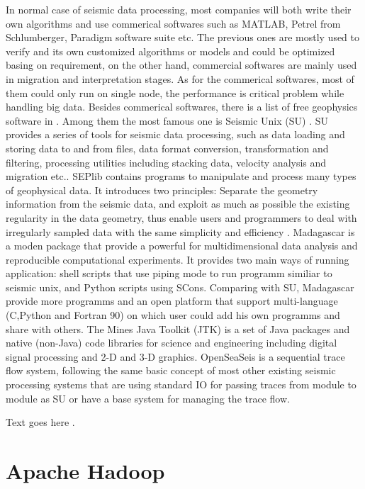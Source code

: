 In normal case of seismic data processing, most companies will both write their own algorithms and use commerical softwares such as MATLAB, Petrel from Schlumberger, Paradigm software suite etc. The previous ones are mostly used to verify and its own customized algorithms or models and could be optimized basing on requirement, on the other hand, commercial softwares are mainly used in migration and interpretation stages. As for the commerical softwares, most of them could only run on single node, the performance is critical problem while handling big data.  
Besides commerical softwares, there is a list of free geophysics software in \cite{listofgeosw}. Among them the most famous one is Seismic Unix (SU) \cite{SUHome}. SU provides a series of tools for seismic data processing, such as data loading and storing data to and from files, data format conversion, transformation and filtering, processing utilities including stacking data, velocity analysis and migration etc.\cite{SUManual}. SEPlib \cite{SEPlibHome} contains programs to manipulate and process many types of geophysical data. It introduces two principles: Separate the geometry information from the seismic data, and exploit as much as possible the existing regularity in the data geometry, thus enable users and programmers to deal with irregularly sampled data with the same simplicity and efficiency \cite{SEPManual}. Madagascar \cite{MadagascarHome} is a moden package that provide a powerful for multidimensional data analysis and reproducible computational experiments. It provides two main ways of running application: shell scripts that use piping mode to run programm similiar to seismic unix, and Python scripts using SCons. Comparing with SU, Madagascar provide more programms and an open platform that support multi-language (C,Python and Fortran 90) on which user could add his own programms and share with others. The Mines Java Toolkit (JTK) \cite{JTKHome} is a set of Java packages and native (non-Java) code libraries for science and engineering including digital signal processing and 2-D and 3-D graphics. OpenSeaSeis \cite{OpenSeaSeis} is a sequential trace flow system, following the same basic concept of most other existing seismic processing systems that are using standard I\/O for passing traces from module to module as SU or have a base system for managing the trace flow.





Text goes here \cite{ApacheHadoop}. 


\section{Apache Hadoop}

